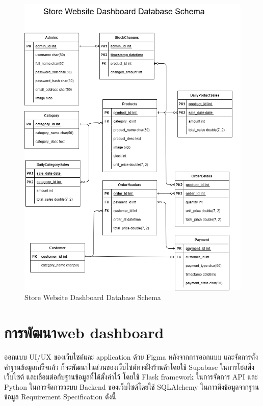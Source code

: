 \begin{figure}[h]
  \begin{center}
    \includegraphics[scale=0.3]{pic/dataweb.png}
    \end{center}
    
    \caption[Store Website Dashboard Database Schema]{Store Website Dashboard Database Schema}
    \label{fig:Store Website Dashboard Database Schema}
    \end{figure}
  
\section{การพัฒนาweb dashboard }


ออกแบบ UI/UX ของเว็บไซต์และ application ด้วย Figma
หลังจากการออกแบบ และจัดการตั้งค่าฐานข้อมูลเสร็จแล้ว
 ก็จะพัฒนาในส่วนของเว็บไซต์ทางฝั่งร้านค้าโดยใช้ Supabase ในการโฮสติ้งเว็บไซต์ 
 และเชื่อมต่อกับฐานข้อมูลที่ได้ตั้งค่าไว้ โดยใช้ Flask framework 
 ในการจัดการ API และ Python ในการจัดการระบบ Backend ของเว็บไซต์โดยใช้ SQLAlchemy
  ในการดึงข้อมูลจากฐานข้อมูล Requirement Specification ดังนี้

